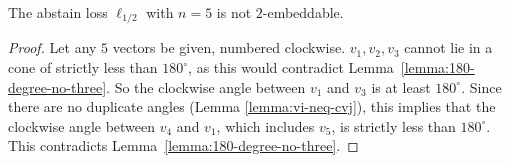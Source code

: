 \documentclass[anon]{colt2020} %
\newcommand{\Comments}{1}
\newcommand{\mynote}[2]{\ifnum\Comments=1\textcolor{#1}{#2}\fi}
\newcommand{\bo}[1]{\mynote{blue}{[Bo: #1]}}
\newcommand{\reals}{\mathbb{R}}
\begin{document}
\begin{proposition}
	The abstain loss $\ell_{1/2}$ with $n=5$ is not $2$-embeddable.
\end{proposition}
\begin{proof}
	Let any $5$ vectors be given, numbered clockwise.
	$v_1,v_2,v_3$ cannot lie in a cone of strictly less than $180^{\circ}$, as this would contradict Lemma~\ref{lemma:180-degree-no-three}.
	So the clockwise angle between $v_1$ and $v_3$ is at least $180^{\circ}$.
	Since there are no duplicate angles (Lemma \ref{lemma:vi-neq-cvj}), this implies that the clockwise angle between $v_4$ and $v_1$, which includes $v_5$, is strictly less than $180^{\circ}$.
	This contradicts Lemma~\ref{lemma:180-degree-no-three}.
\end{proof}

%
%
%
\end{document}
